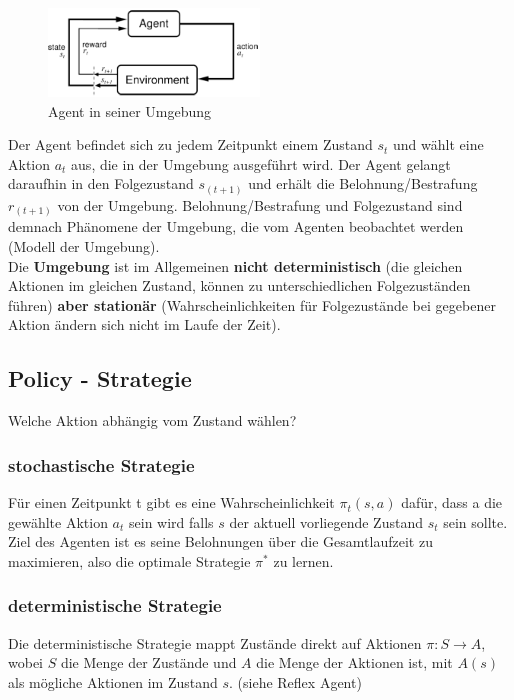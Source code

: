 \documentclass[10pt]{scrartcl}
\begin{document}
\begin{figure}[htbp]
	\centering	\includegraphics[width=0.5\textwidth]{Bilder/Agent.png}
	\caption{Agent in seiner Umgebung}
	\label{fig:Agent}
\end{figure}

Der Agent befindet sich zu jedem Zeitpunkt  einem Zustand $s_{t}$ und wählt eine Aktion $a_{t}$ aus, die in der Umgebung ausgeführt wird. Der Agent gelangt daraufhin in den Folgezustand $s_{(t+1)}$ und erhält die Belohnung/Bestrafung $r_{(t+1)}$ von der Umgebung. Belohnung/Bestrafung und Folgezustand sind demnach Phänomene der Umgebung, die vom Agenten beobachtet werden (Modell der Umgebung).\\
Die \textbf{Umgebung} ist im Allgemeinen \textbf{nicht deterministisch} (die gleichen Aktionen im gleichen Zustand, können zu unterschiedlichen Folgezuständen führen) \textbf{aber stationär} (Wahrscheinlichkeiten für Folgezustände bei gegebener Aktion ändern sich nicht im Laufe der Zeit).

\subsection{Policy - Strategie}
Welche Aktion abhängig vom Zustand wählen?

\subsubsection{stochastische Strategie}
Für einen Zeitpunkt t gibt es eine Wahrscheinlichkeit $\pi_{t}(s,a)$ dafür, dass a die gewählte Aktion $a_{t}$ sein wird falls $s$ der aktuell vorliegende Zustand $s_{t}$ sein sollte. Ziel des Agenten ist es seine Belohnungen über die Gesamtlaufzeit zu maximieren, also die optimale Strategie $\pi^{*}$ zu lernen.

\subsubsection{deterministische Strategie}
Die deterministische Strategie mappt Zustände direkt auf Aktionen $\pi: S \rightarrow A$, wobei $S$ die Menge der Zustände und $A$ die Menge der Aktionen ist, mit $A(s)$ als mögliche Aktionen im Zustand $s$. (siehe Reflex Agent)
\end{document}
